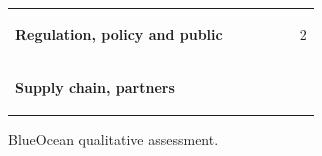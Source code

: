 \documentclass[10pt,a4paper]{article}
\begin{document}
{\begin{tabular}{p{38mm}>{\centering\arraybackslash}p{21mm}>{\centering\arraybackslash}p{21mm}>{\centering\arraybackslash}p{21mm}>{\centering\arraybackslash}p{21mm}}
{\bfseries Regulation, policy and public} & \colorbox{BOBlue}{\textcolor{white}{\strut\hspace{5pt}3\hspace{5pt}}} & \colorbox{BOBlue}{\textcolor{white}{\strut\hspace{5pt}3\hspace{5pt}}} & \colorbox{BOBlue}{\textcolor{white}{\strut\hspace{5pt}3\hspace{5pt}}} & \colorbox{BOLight}{\textcolor{BOText}{\strut\hspace{5pt}2\hspace{5pt}}} \\
{\bfseries Supply chain, partners} & \colorbox{BOGreen}{\textcolor{white}{\strut\hspace{5pt}5\hspace{5pt}}} & \colorbox{BOBlue}{\textcolor{white}{\strut\hspace{5pt}3\hspace{5pt}}} & \colorbox{BOBlue}{\textcolor{white}{\strut\hspace{5pt}3\hspace{5pt}}} & \colorbox{BOBlue}{\textcolor{white}{\strut\hspace{5pt}3\hspace{5pt}}} \\
\end{tabular}}\par\vspace{2pt}
\par
{\scriptsize\color{BOMuted} BlueOcean qualitative assessment.}\par
\end{document}

